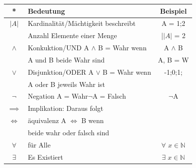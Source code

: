 \begin{multicols}{2}
    \begin{tabularx}{0.5\textwidth} {
            | >{\raggedright\arraybackslash}c
            | >{\raggedright\arraybackslash}X
            | >{\raggedright\arraybackslash}c |}
        \hline
        \textbf{*}            & \textbf{Bedeutung}                        & \textbf{Beispiel}             \\ \hline
        $|A|$                 & Kardinalität/Mächtigkeit beschreibt       & A = {1;2}                     \\
                              & Anzahl Elemente einer Menge               & |$|A|$ = 2                    \\ \hline
        $\land$               & Konkuktion/UND A $\land$ B = Wahr wenn    & A $\land$ B                   \\
                              & A und B beide Wahr sind                   & A, B = W                      \\ \hline
        $\lor$                & Disjunktion/ODER A $\lor$ B  = Wahr wenn  & {-1;0;1;}                     \\
                              & A oder B  jeweils Wahr ist                &                               \\ \hline
        $\neg$                & Negation A = Wahr$\neg$A = Falsch         & $\neg $A                      \\\hline
        $\implies$            & Implikation: Daraus folgt                 &                               \\ \hline
        $\Longleftrightarrow$ & äquivalenz A $\Longleftrightarrow$ B wenn &                               \\
                              & beide wahr oder falsch sind               &                               \\ \hline
        $\forall$             & für Alle                                  & $\forall$ $x \in \mathbb{N}$  \\ \hline
        $\exists$             & Es Existiert                              & $\exists $ $x \in \mathbb{N}$ \\ \hline
    \end{tabularx}


\end{multicols}
